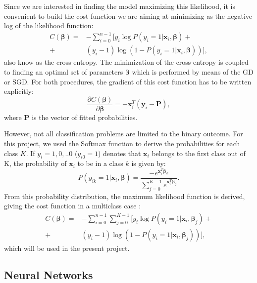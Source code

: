 \documentclass{emulateapj}
\begin{document}
Since we are interested in finding the model maximizing this likelihood, it is convenient to build the cost function we are aiming at minimizing as the negative log of the likelihood function:
\begin{equation}
\begin{split}
C(\boldsymbol{\beta})=&-\sum_{i=0}^{n-1} [y_i \log{P(y_i=1|\textbf{x}_i,\boldsymbol{\beta})}+\\
+&(y_i-1)\log{(1-P(y_i=1|\textbf{x}_i,\boldsymbol{\beta}))}],
\end{split}
\end{equation}
also know as the cross-entropy. The minimization of the cross-entropy is coupled to finding an optimal set of parameters $\boldsymbol{\beta}$ which is performed by means of the GD or SGD. For both procedures, the gradient of this cost function has to be written explicitly:
\begin{equation}
    \frac{\partial C(\boldsymbol{\beta})}{\partial \boldsymbol{\beta}}= - \textbf{x}_i^T(\textbf{y}_i-\textbf{P}),
\end{equation}
where \textbf{P} is the vector of fitted probabilities.

However, not all classification problems are limited to the binary outcome. For this project, we used the Softmax function to derive the probabilities for each class $K$. If $y_i={1,0,..0}$ ($y_{i0}=1$) denotes that $\textbf{x}_i$ belongs to the first class out of K, the probability of $\textbf{x}_i$ to be in a class $k$ is given by:
\begin{equation}\label{eq:softmax}
    P(y_{ik}=1|\textbf{x}_i,\boldsymbol{\beta} )=\frac{-e^{\textbf{x}_i^T\boldsymbol{\beta}_k}}{\sum_{j=0}^{K-1}e^{\textbf{x}_i^T\boldsymbol{\beta}_j}}.
\end{equation}
From this probability distribution, the maximum likelihood function is derived, giving the cost function in a multiclass case \cite{high bias}:
\begin{equation}\label{eq: cross entropy}
\begin{split}
C(\boldsymbol{\beta})=&-\sum_{i=0}^{n-1}\sum_{j=0}^{K-1} [y_i \log{P(y_i=1|\textbf{x}_i,\boldsymbol{\beta}_j)}+\\
+&(y_i-1)\log{(1-P(y_i=1|\textbf{x}_i,\boldsymbol{\beta}_j))}],
\end{split} 
\end{equation}
which will be used in the present project.

\subsection{Neural Networks}
\label{subsec: NN}
\end{document}
